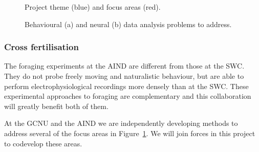 \begin{figure}
    \begin{center}
        \resizebox{4.0in}{!}{%
            
        }
    \end{center}
    \caption{Project theme (blue) and focus areas (red).}
    \label{fig:focusAreas}
\end{figure}

\begin{figure}
    \centering
    \subfloat[]{
        \resizebox{3.0in}{!}{%
            
        }
    }
    \hfill
    \subfloat[]{
        \resizebox{2.25in}{!}{%
            
        }
    }
    \caption{Behavioural (a) and neural (b) data analysis problems to address.}
    \label{fig:dataAnalysis}
\end{figure}

\subsubsection{Cross fertilisation}

The foraging experiments at the AIND are different from those at
the SWC. They do not probe freely moving and naturalistic behaviour, but are
able to perform electrophysiological recordings more densely than at the SWC.
%
These experimental approaches to foraging are complementary and this
collaboration will greatly benefit both of them.

At the GCNU and the AIND we are independently developing methods to address several of the focus areas in Figure~\ref{fig:focusAreas}. We will join forces in this project to codevelop these areas.